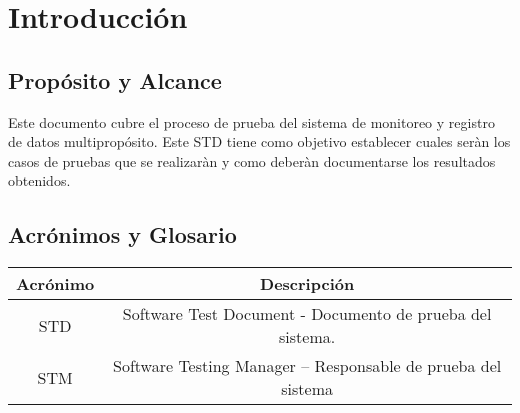\newpage
\section{\textcolor[gray]{.2}{Introducción}}
\subsection{\textcolor[gray]{.2}{Propósito y Alcance}}
Este documento cubre el proceso de prueba del sistema de monitoreo y registro de datos multipropósito. Este STD tiene como objetivo establecer cuales seràn los casos de pruebas que se realizaràn y como deberàn documentarse los resultados obtenidos.

\subsection{\textcolor[gray]{.2}{Acrónimos y Glosario}}
\begin{table}[!h]
\begin{center}
\begin{tabular}{|c|c|}
\hline
\rowcolor[gray]{.8} Acrónimo & Descripción \\
\hline
STD & Software Test Document - Documento de prueba del sistema. \\
\hline
STM & Software Testing Manager – Responsable de prueba del sistema\\
\hline
\end{tabular}
\end{center}
\end{table}


